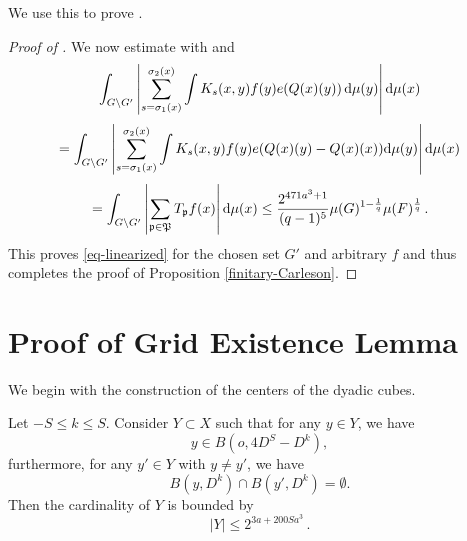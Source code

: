 We use this to prove .
\begin{proof}[Proof of ]
\leanok
We now estimate with  and 
\begin{equation}
 \int_{G \setminus G'} \left|\sum_{s={\sigma_1}(x)}^{{\sigma_2}(x)} \int K_s(x,y) f(y) e({Q}(x)(y)) \, \mathrm{d}\mu(y)\right| \mathrm{d}\mu(x)
\end{equation}
\begin{equation}
 =\int_{G \setminus G'} \left|\sum_{s={\sigma_1}(x)}^{{\sigma_2}(x)} \int K_s(x,y) f(y) e({Q}(x)(y) - {Q}(x)(x))\mathrm{d}\mu(y)\right| \mathrm{d}\mu(x)
\end{equation}
\begin{equation}
 =\int_{G \setminus G'} \left|\sum_{{\mathfrak p}\in {\mathfrak P}}T_{{\mathfrak p}} f(x)\right| \mathrm{d}\mu(x)
 \le \frac{2^{471a^3+1}}{(q-1)^5} \mu(G)^{1 - \frac{1}{q}} \mu(F)^{\frac{1}{q}} \,.
\end{equation}
This proves \eqref{eq-linearized} for the chosen set $G'$ and arbitrary $f$ and thus completes the proof of Proposition
\ref{finitary-Carleson}.
\end{proof}


\section{Proof of Grid Existence Lemma}
\label{subsecdyadic}

We begin with the construction of the centers of the dyadic cubes.
\begin{lemma}
    \label{counting-balls}
    \leanok
    Let $-S\le k\le S$. Consider $Y\subset X$ such that for any $y\in Y$, we have
    \begin{equation}\label{ybinb}
    y\in B(o,4D^S-D^k),
    \end{equation}
    furthermore, for any $y'\in Y$ with $y\neq y'$, we have
    \begin{equation} \label{eq-disj-yballs}
        B(y,D^k)\cap B(y',D^k)=\emptyset.
    \end{equation}
    Then the cardinality of $Y$ is bounded by
    \begin{equation}\label{boundY}
        |Y|\le 2^{3a + 200Sa^3}\, .
    \end{equation}
\end{lemma}


